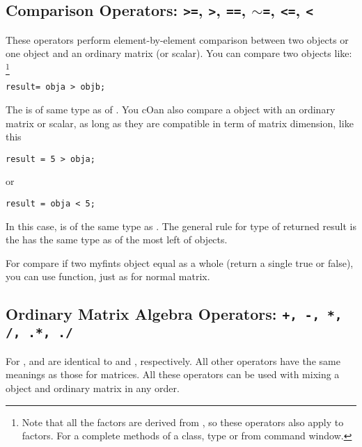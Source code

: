 \subsection{Comparison Operators: \texttt{>=}, \texttt{>}, \texttt{==}, \texttt{$\sim$=}, \texttt{<=}, \texttt{<}}

      These operators perform element-by-element comparison between two  objects
      or one  object and an ordinary \matlab{} matrix (or scalar).
      You can compare two  objects like:
      \footnote{Note that all the factors are derived from , 
      so these operators also apply to factors.
      For a complete methods of a class, type  or 
      from \matlab{} command window.}
      \begin{lstlisting}[numbers=none]
         result= obja > objb;
      \end{lstlisting}
      The  is of same type as of .
      You cOan also compare a  object with an ordinary matrix or scalar, 
      as long as they are compatible in term of matrix dimension, like this
      \begin{lstlisting}[numbers=none]
         result = 5 > obja;
      \end{lstlisting}
         or
      \begin{lstlisting}[numbers=none]
         result = obja < 5;
      \end{lstlisting}
      In this case,  is of the same type as .
      The general rule for type of returned result is the  
      has the same type as of the most left of  objects.

      For compare if two myfints object equal as a whole (return a single true or false),
      you can use  function, just as for normal \matlab{} matrix.

\subsection{Ordinary Matrix Algebra Operators: \texttt{+, -, *, /, .*, ./}}

     For \myfints, \mcode{*} and \mcode{/} are identical to  and , respectively.
     All other operators have the same meanings as those for \matlab{} matrices. 
	 All these operators can be used with mixing a \myfints{} object and ordinary matrix in any order.

